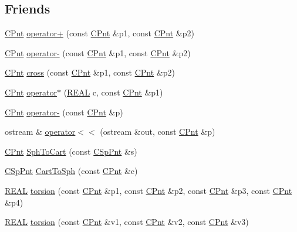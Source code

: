 \subsection*{Friends}
\begin{DoxyCompactItemize}
\item 
\hyperlink{classCPnt}{C\-Pnt} \hyperlink{classCPnt_a793e034bed9900c45412db255d708e84}{operator+} (const \hyperlink{classCPnt}{C\-Pnt} \&p1, const \hyperlink{classCPnt}{C\-Pnt} \&p2)
\item 
\hyperlink{classCPnt}{C\-Pnt} \hyperlink{classCPnt_a7b0ef59814c5c3ae6a9165df62ab8598}{operator-\/} (const \hyperlink{classCPnt}{C\-Pnt} \&p1, const \hyperlink{classCPnt}{C\-Pnt} \&p2)
\item 
\hyperlink{classCPnt}{C\-Pnt} \hyperlink{classCPnt_ab4553c75d2ac17d0539471baeb0c0237}{cross} (const \hyperlink{classCPnt}{C\-Pnt} \&p1, const \hyperlink{classCPnt}{C\-Pnt} \&p2)
\item 
\hyperlink{classCPnt}{C\-Pnt} \hyperlink{classCPnt_a6bf4a1152989f36cdb084e617a81214b}{operator$\ast$} (\hyperlink{util_8h_a5821460e95a0800cf9f24c38915cbbde}{R\-E\-A\-L} c, const \hyperlink{classCPnt}{C\-Pnt} \&p1)
\item 
\hyperlink{classCPnt}{C\-Pnt} \hyperlink{classCPnt_a77ba614aeb115f5ab29247677cc4fa05}{operator-\/} (const \hyperlink{classCPnt}{C\-Pnt} \&p)
\item 
ostream \& \hyperlink{classCPnt_a5d9fde839f5480f04e4b64a9621e3370}{operator$<$$<$} (ostream \&out, const \hyperlink{classCPnt}{C\-Pnt} \&p)
\item 
\hyperlink{classCPnt}{C\-Pnt} \hyperlink{classCPnt_af8b263bb80bb3a76271a7f57d5057df3}{Sph\-To\-Cart} (const \hyperlink{classCSpPnt}{C\-Sp\-Pnt} \&s)
\item 
\hyperlink{classCSpPnt}{C\-Sp\-Pnt} \hyperlink{classCPnt_ad05fbf75e7550a927bc817f97115f2fc}{Cart\-To\-Sph} (const \hyperlink{classCPnt}{C\-Pnt} \&c)
\item 
\hyperlink{util_8h_a5821460e95a0800cf9f24c38915cbbde}{R\-E\-A\-L} \hyperlink{classCPnt_ac25278586b4a84caf4098513d812d60b}{torsion} (const \hyperlink{classCPnt}{C\-Pnt} \&p1, const \hyperlink{classCPnt}{C\-Pnt} \&p2, const \hyperlink{classCPnt}{C\-Pnt} \&p3, const \hyperlink{classCPnt}{C\-Pnt} \&p4)
\item 
\hyperlink{util_8h_a5821460e95a0800cf9f24c38915cbbde}{R\-E\-A\-L} \hyperlink{classCPnt_a774fe41d28888a078993d8d3384c34d8}{torsion} (const \hyperlink{classCPnt}{C\-Pnt} \&v1, const \hyperlink{classCPnt}{C\-Pnt} \&v2, const \hyperlink{classCPnt}{C\-Pnt} \&v3)
\end{DoxyCompactItemize}


